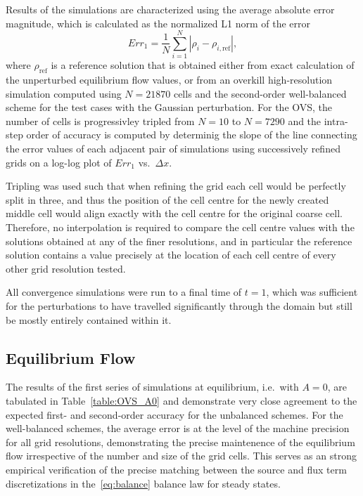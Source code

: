 Results of the simulations are characterized using the average absolute error magnitude, which is calculated as the normalized L1 norm of the error
\begin{equation}
Err_1=\frac{1}{N}\sum\limits_{i=1}^N \left|\rho_i-\rho_{i,\textrm{ref}}\right|,
\end{equation}
where $\rho_{\textrm{ref}}$ is a reference solution that is obtained either from exact calculation of the unperturbed equilibrium flow values, or from an overkill high-resolution simulation computed using $N=21870$ cells and the second-order well-balanced scheme for the test cases with the Gaussian perturbation. For the OVS, the number of cells is progressivley tripled from $N=10$ to $N=7290$ and the intra-step order of accuracy is computed by determinig the slope of the line connecting the error values of each adjacent pair of simulations using successively refined grids on a log-log plot of $Err_1$ vs.\ $\Delta x$.

Tripling was used such that when refining the grid each cell would be perfectly split in three, and thus the position of the cell centre for the newly created middle cell would align exactly with the cell centre for the original coarse cell. Therefore, no interpolation is required to compare the cell centre values with the solutions obtained at any of the finer resolutions, and in particular the reference solution contains a value precisely at the location of each cell centre of every other grid resolution tested.

All convergence simulations were run to a final time of $t=1$, which was sufficient for the perturbations to have travelled significantly through the domain but still be mostly entirely contained within it.

\subsection{Equilibrium Flow}

The results of the first series of simulations at equilibrium, i.e.\ with $A=0$, are tabulated in Table~\ref{table:OVS_A0} and demonstrate very close agreement to the expected first- and second-order accuracy for the unbalanced schemes. For the well-balanced schemes, the average error is at the level of the machine precision for all grid resolutions, demonstrating the precise maintenence of the equilibrium flow irrespective of the number and size of the grid cells. This serves as an strong empirical verification of the precise matching between the source and flux term discretizations in the~\eqref{eq:balance} balance law for steady states.

